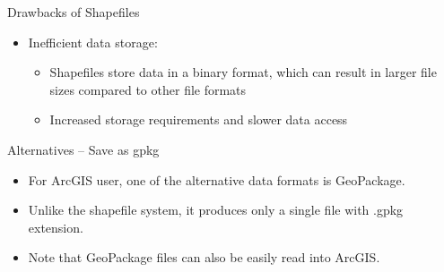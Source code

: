 \documentclass[hyperref={pdfpagelabels=false}]{beamer}
\begin{document}
\begin{frame}[fragile]{Drawbacks of Shapefiles}
	\begin{itemize}
		
		\item Inefficient data storage:
		\vspace{0.2cm}
		\begin{itemize}
			\item Shapefiles store data in a binary format, which can result in larger file sizes compared to other file formats
			\vspace{0.2cm}
			\item Increased storage requirements and slower data access
		\end{itemize}
		
	\end{itemize}
\end{frame}



\begin{frame}[fragile]{Alternatives -- Save as gpkg}
	\begin{itemize}
		
		\item For ArcGIS user, one of the alternative data formats  is GeoPackage. 
				\vspace{0.2cm}
		\item Unlike the shapefile system, it produces only a single file with .gpkg extension. 
				\vspace{0.2cm}
		\item Note that GeoPackage files can also be easily read into ArcGIS.
		
	
		
	\end{itemize}
\end{frame}
\end{document}
